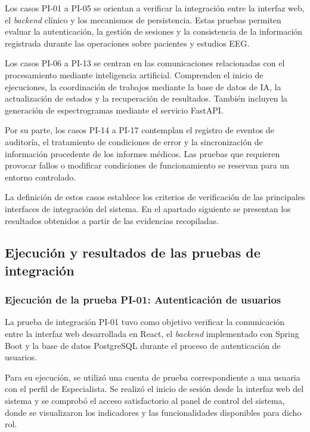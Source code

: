 Los casos PI-01 a PI-05 se orientan a verificar la integración entre la interfaz web, el \textit{backend} clínico y los mecanismos de persistencia. Estas pruebas permiten evaluar la autenticación, la gestión de sesiones y la consistencia de la información registrada durante las operaciones sobre pacientes y estudios EEG.

Los casos PI-06 a PI-13 se centran en las comunicaciones relacionadas con el procesamiento mediante inteligencia artificial. Comprenden el inicio de ejecuciones, la coordinación de trabajos mediante la base de datos de IA, la actualización de estados y la recuperación de resultados. También incluyen la generación de espectrogramas mediante el servicio FastAPI.

Por su parte, los casos PI-14 a PI-17 contemplan el registro de eventos de auditoría, el tratamiento de condiciones de error y la sincronización de información procedente de los informes médicos. Las pruebas que requieren provocar fallos o modificar condiciones de funcionamiento se reservan para un entorno controlado.


La definición de estos casos establece los criterios de verificación de las principales interfaces de integración del sistema. En el apartado siguiente se presentan los resultados obtenidos a partir de las evidencias recopiladas.


\subsection{Ejecución y resultados de las pruebas de integración}

\subsubsection{Ejecución de la prueba PI-01: Autenticación de usuarios}

La prueba de integración PI-01 tuvo como objetivo verificar la comunicación entre la interfaz web desarrollada en React, el \textit{backend} implementado con Spring Boot y la base de datos PostgreSQL durante el proceso de autenticación de usuarios.

Para su ejecución, se utilizó una cuenta de prueba correspondiente a una usuaria con el perfil de Especialista. Se realizó el inicio de sesión desde la interfaz web del sistema y se comprobó el acceso satisfactorio al panel de control del sistema, donde se visualizaron los indicadores y las funcionalidades disponibles para dicho rol.

